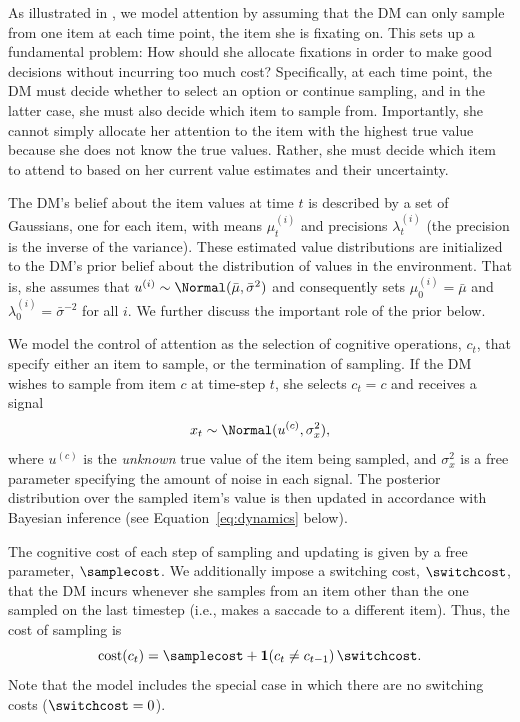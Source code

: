 As illustrated in , we model attention by assuming that the DM can only sample from one item at each time point, the item she is fixating on. This sets up a fundamental problem: How should she allocate fixations in order to make good decisions without incurring too much cost? Specifically, at each time point, the DM must decide whether to select an option or continue sampling, and in the latter case, she must also decide which item to sample from. Importantly, she cannot simply allocate her attention to the item with the highest true value because she does not know the true values. Rather, she must decide which item to attend to based on her current value estimates and their uncertainty. 

The DM's belief about the item values at time $t$ is described by a set of Gaussians, one for each item, with means $\mu_t^{(i)}$ and precisions $\lambda_t^{(i)}$ (the precision is the inverse of the variance). These estimated value distributions are initialized to the DM's prior belief about the distribution of values in the environment. That is, she assumes that $u^{(i)} \sim \Normal(\bar{\mu}, \bar{\sigma}^2)$ and consequently sets $\mu_0^{(i)} = \bar{\mu}$ and $\lambda_0^{(i)} = \bar{\sigma}^{-2}$ for all $i$. We further discuss the important role of the prior below.

We model the control of attention as the selection of cognitive operations, $c_t$, that specify either an item to sample, or the termination of sampling. If the DM wishes to sample from item $c$ at time-step $t$, she selects $c_t=c$ and receives a signal
\begin{equation}\label{eq:signal}
x_{t}\sim \Normal(u^{(c)},\sigma_{x}^{2}),  
\end{equation}
where $u^{(c)}$ is the \emph{unknown} true value of the item being sampled, and $\sigma_{x}^{2}$ is a free parameter specifying the amount of noise in each signal. The posterior distribution over the sampled item's value is then updated in accordance with Bayesian inference (see Equation~\ref{eq:dynamics} below).

The cognitive cost of each step of sampling and updating is given by a free parameter, $\samplecost$. We additionally impose a switching cost, $\switchcost$, that the DM incurs whenever she samples from an item other than the one sampled on the last timestep (i.e., makes a saccade to a different item). Thus,
the cost of sampling is 
\begin{equation}
  \label{eq:cost}
  \text{cost}(c_t) = \samplecost + \mathbf{1}(c_{t}\neq c_{t-1})\,\switchcost.
\end{equation}
Note that the model includes the special case in which there are no switching costs ($\switchcost=0$).

